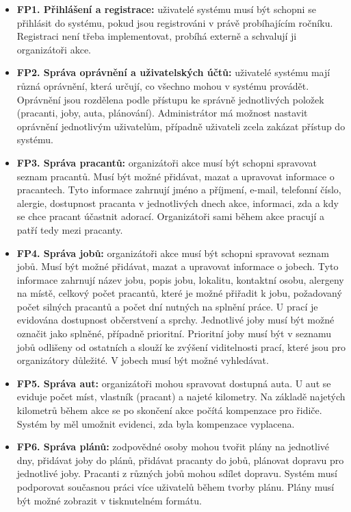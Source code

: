 \begin{itemize}
    \item \textbf{FP1. Přihlášení a registrace:} uživatelé systému musí být schopni se přihlásit do systému, pokud jsou registrováni v právě probíhajícím ročníku. Registraci není třeba implementovat, probíhá externě a schvalují ji organizátoři akce.
    \item \textbf{FP2. Správa oprávnění a uživatelských účtů:} uživatelé systému mají různá oprávnění, která určují, co všechno mohou v systému provádět. Oprávnění jsou rozdělena podle přístupu ke správně jednotlivých položek (pracanti, joby, auta, plánování). Administrátor má možnost nastavit oprávnění jednotlivým uživatelům, případně uživateli zcela zakázat přístup do systému.
    \item \textbf{FP3. Správa pracantů:} organizátoři akce musí být schopni spravovat seznam pracantů. Musí být možné přidávat, mazat a upravovat informace o pracantech. Tyto informace zahrnují jméno a příjmení, e-mail, telefonní číslo, alergie, dostupnost pracanta v jednotlivých dnech akce, informaci, zda a kdy se chce pracant účastnit adorací. Organizátoři sami během akce pracují a patří tedy mezi pracanty.
    \item \textbf{FP4. Správa jobů:} organizátoři akce musí být schopni spravovat seznam jobů. Musí být možné přidávat, mazat a upravovat informace o jobech. Tyto informace zahrnují název jobu, popis jobu, lokalitu, kontaktní osobu, alergeny na místě, celkový počet pracantů, které je možné přiřadit k jobu, požadovaný počet silných pracantů a počet dní nutných na splnění práce. U prací je evidována dostupnost občerstvení a sprchy. Jednotlivé joby musí být možné označit jako splněné, případně prioritní. Prioritní joby musí být v seznamu jobů odlišeny od ostatních a slouží ke zvýšení viditelnosti prací, které jsou pro organizátory důležité. V jobech musí být možné vyhledávat.
    \item \textbf{FP5. Správa aut:} organizátoři mohou spravovat dostupná auta. U aut se eviduje počet míst, vlastník (pracant) a najeté kilometry. Na základě najetých kilometrů během akce se po skončení akce počítá kompenzace pro řidiče. Systém by měl umožnit evidenci, zda byla kompenzace vyplacena.
    \item \textbf{FP6. Správa plánů:} zodpovědné osoby mohou tvořit plány na jednotlivé dny, přidávat joby do plánů, přidávat pracanty do jobů, plánovat dopravu pro jednotlivé joby. Pracanti z různých jobů mohou sdílet dopravu. Systém musí podporovat současnou práci více uživatelů během tvorby plánu. Plány musí být možné zobrazit v tisknutelném formátu.

\end{itemize}
